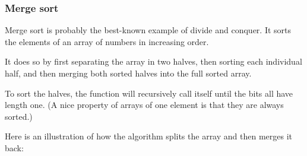 \subsubsection{Merge sort}

Merge sort is probably the best-known example of divide and conquer.
It sorts the elements of an array of numbers in increasing order.

It does so by first separating the array in two halves,
then sorting each individual half,
and then merging both sorted halves into the full sorted array.

To sort the halves, the function will recursively call itself
until the bits all have length one.
(A nice property of arrays of one element is that they are always sorted.)

Here is an illustration of how the algorithm splits the array
and then merges it back:
